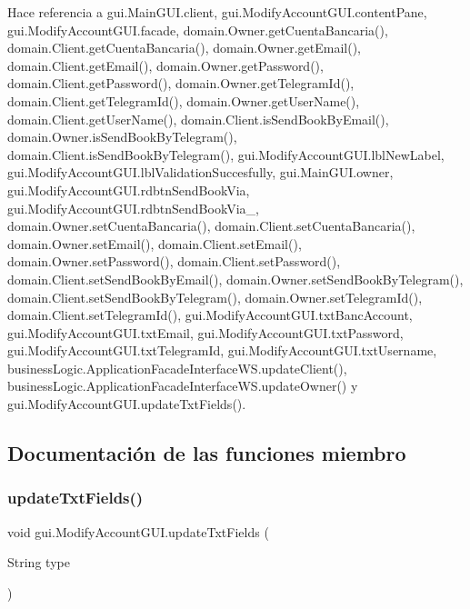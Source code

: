 Hace referencia a gui.\+Main\+G\+U\+I.\+client, gui.\+Modify\+Account\+G\+U\+I.\+content\+Pane, gui.\+Modify\+Account\+G\+U\+I.\+facade, domain.\+Owner.\+get\+Cuenta\+Bancaria(), domain.\+Client.\+get\+Cuenta\+Bancaria(), domain.\+Owner.\+get\+Email(), domain.\+Client.\+get\+Email(), domain.\+Owner.\+get\+Password(), domain.\+Client.\+get\+Password(), domain.\+Owner.\+get\+Telegram\+Id(), domain.\+Client.\+get\+Telegram\+Id(), domain.\+Owner.\+get\+User\+Name(), domain.\+Client.\+get\+User\+Name(), domain.\+Client.\+is\+Send\+Book\+By\+Email(), domain.\+Owner.\+is\+Send\+Book\+By\+Telegram(), domain.\+Client.\+is\+Send\+Book\+By\+Telegram(), gui.\+Modify\+Account\+G\+U\+I.\+lbl\+New\+Label, gui.\+Modify\+Account\+G\+U\+I.\+lbl\+Validation\+Succesfully, gui.\+Main\+G\+U\+I.\+owner, gui.\+Modify\+Account\+G\+U\+I.\+rdbtn\+Send\+Book\+Via, gui.\+Modify\+Account\+G\+U\+I.\+rdbtn\+Send\+Book\+Via\+\_, domain.\+Owner.\+set\+Cuenta\+Bancaria(), domain.\+Client.\+set\+Cuenta\+Bancaria(), domain.\+Owner.\+set\+Email(), domain.\+Client.\+set\+Email(), domain.\+Owner.\+set\+Password(), domain.\+Client.\+set\+Password(), domain.\+Client.\+set\+Send\+Book\+By\+Email(), domain.\+Owner.\+set\+Send\+Book\+By\+Telegram(), domain.\+Client.\+set\+Send\+Book\+By\+Telegram(), domain.\+Owner.\+set\+Telegram\+Id(), domain.\+Client.\+set\+Telegram\+Id(), gui.\+Modify\+Account\+G\+U\+I.\+txt\+Banc\+Account, gui.\+Modify\+Account\+G\+U\+I.\+txt\+Email, gui.\+Modify\+Account\+G\+U\+I.\+txt\+Password, gui.\+Modify\+Account\+G\+U\+I.\+txt\+Telegram\+Id, gui.\+Modify\+Account\+G\+U\+I.\+txt\+Username, business\+Logic.\+Application\+Facade\+Interface\+W\+S.\+update\+Client(), business\+Logic.\+Application\+Facade\+Interface\+W\+S.\+update\+Owner() y gui.\+Modify\+Account\+G\+U\+I.\+update\+Txt\+Fields().



\subsection{Documentación de las funciones miembro}
\mbox{\label{classgui_1_1_modify_account_g_u_i_afacb446b63aaccea7ffc445a726bea94}} 
\subsubsection{\texorpdfstring{updateTxtFields()}{updateTxtFields()}}
{\footnotesize\ttfamily void gui.\+Modify\+Account\+G\+U\+I.\+update\+Txt\+Fields (\begin{DoxyParamCaption}\item[{String}]{type }\end{DoxyParamCaption})}



